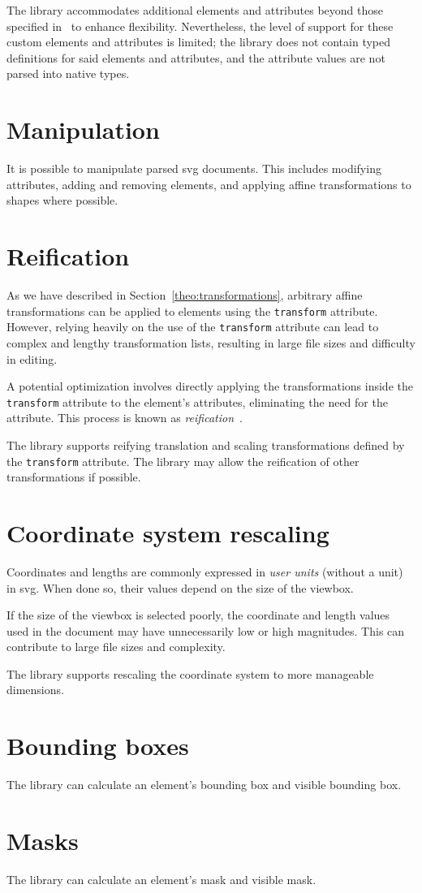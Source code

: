 The library accommodates additional elements and attributes beyond those specified in~\cite{svg11} to enhance flexibility. Nevertheless, the level of support for these custom elements and attributes is limited; the library does not contain typed definitions for said elements and attributes, and the attribute values are not parsed into native types.

\section{Manipulation}

It is possible to manipulate parsed \gls{svg} documents. This includes modifying attributes, adding and removing elements, and applying affine transformations to shapes where possible.

\section{Reification}

As we have described in Section~\ref{theo:transformations}, arbitrary affine transformations can be applied to elements using the \texttt{transform} attribute. However, relying heavily on the use of the \texttt{transform} attribute can lead to complex and lengthy transformation lists, resulting in large file sizes and difficulty in editing.

A potential optimization involves directly applying the transformations inside the \texttt{transform} attribute to the element's attributes, eliminating the need for the attribute. This process is known as \emph{reification}~\cite{svgelements}.

The library supports reifying translation and scaling transformations defined by the \texttt{transform} attribute. The library may allow the reification of other transformations if possible.

\section{Coordinate system rescaling}

Coordinates and lengths are commonly expressed in \emph{user units} (without a unit) in \gls{svg}. When done so, their values depend on the size of the viewbox.

If the size of the viewbox is selected poorly, the coordinate and length values used in the document may have unnecessarily low or high magnitudes. This can contribute to large file sizes and complexity. 

The library supports rescaling the coordinate system to more manageable dimensions.

\section{Bounding boxes}

The library can calculate an element's bounding box and visible bounding box.

\section{Masks}

The library can calculate an element's mask and visible mask.

